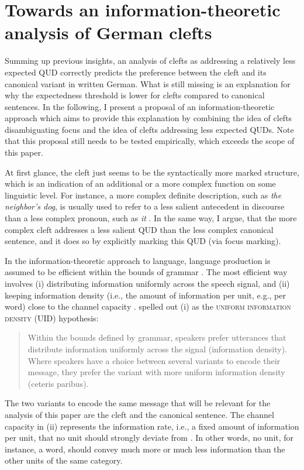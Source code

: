 \documentclass[output=paper,colorlinks,citecolor=brown]{langscibook}
\begin{document}
\section{Towards an information-theoretic analysis of German clefts}\label{sec:info-analysis}

Summing up previous insights, an analysis of clefts as addressing a relatively less expected QUD correctly predicts the preference between the cleft and its canonical variant in written German. What is still missing is an explanation for why the expectedness threshold is lower for clefts compared to canonical sentences. In the following, I present a proposal of an information-theoretic approach which aims to provide this explanation by combining the idea of clefts disambiguating focus and the idea of clefts addressing less expected QUDs. Note that this proposal still needs to be tested empirically, which exceeds the scope of this paper.

At first glance, the cleft just seems to be the syntactically more marked structure, which is an indication of an additional or a more complex function on some linguistic level. For instance, a more complex definite description, such as \textit{the neighbor's dog}, is usually used to refer to a less salient antecedent in discourse than a less complex pronoun, such as \textit{it} \citep[e.g.,][]{gundel_et_al_1993}. In the same way, I argue, that the more complex cleft addresses a less salient QUD than the less complex canonical sentence, and it does so by explicitly marking this QUD (via focus marking).
    
In the information-theoretic approach to language, language production is assumed to be efficient within the bounds of grammar \citep{jaeger_2010}. The most efficient way involves (i) distributing information uniformly across the speech signal, and (ii) keeping information density (i.e., the amount of information per unit, e.g., per word) close to the channel capacity \citep{genzel_charniak_2002,levy_jaeger_2007}. \citet{jaeger_2010} spelled out (i) as the \textsc{uniform information density} (UID) hypothesis: 
\begin{quote}
    Within the bounds defined by grammar, speakers prefer utterances that distribute information uniformly across the signal (information density). Where speakers have a choice between several variants to encode their message, they prefer the variant with more uniform information density (ceteris paribus). \citep[][25]{jaeger_2010}
\end{quote} The two variants to encode the same message that will be relevant for the analysis of this paper are the cleft and the canonical sentence. The channel capacity in (ii) represents the information rate, i.e., a fixed amount of information per unit, that no unit should strongly deviate from \citep[see][]{genzel_charniak_2002}. In other words, no unit, for instance, a word, should convey much more or much less information than the other units of the same category. 
\end{document}
